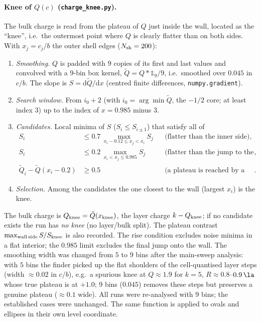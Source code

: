 \paragraph{Knee of $Q(c)$ (\texttt{charge\_knee.py}).}
The bulk charge is read from the plateau of $Q$ just inside the wall, located as the
``knee'', i.e.\ the outermost point where $Q$ is clearly flatter than on both sides.
With $x_j=c_j/b$ the outer shell edges ($N_{\rm sh}=200$):
\begin{enumerate}
  \item \emph{Smoothing.} $Q$ is padded with $9$ copies of its first and last values and
        convolved with a $9$-bin box kernel, $\tilde Q = Q * \mathbb{1}_9/9$, i.e.\ smoothed over
        $0.045$ in $c/b$. The slope is $S=\mathrm{d}\tilde Q/\mathrm{d}x$ (centred finite differences,
        \texttt{numpy.gradient}).
  \item \emph{Search window.} From $i_0+2$ (with $i_0=\arg\min\tilde Q$, the $-1/2$ core; at least
        index 3) up to the index of $x=0.985$ minus 3.
  \item \emph{Candidates.} Local minima of $S$ ($S_i\le S_{i\pm1}$) that satisfy all of
        \begin{align}
          S_i &\le 0.7\, \max_{x_i-0.12\le x_j< x_i} S_j &&\text{(flatter than the inner side)},\\
          S_i &\le 0.2\, \max_{x_i< x_j\le 0.985} S_j &&\text{(flatter than the jump to the wall)},\\
          \tilde Q_i - \tilde Q(x_i-0.2) &\ge 0.5 &&\text{(a plateau is reached by a rise)} .
        \end{align}
  \item \emph{Selection.} Among the candidates the one closest to the wall (largest $x_i$) is the knee.
\end{enumerate}
The bulk charge is $Q_{\rm knee}=\tilde Q(x_{\rm knee})$, the layer charge $k-Q_{\rm knee}$; if no
candidate exists the run has \emph{no knee} (no layer/bulk split). The plateau contrast
$\max_{\rm wall\,side}S/S_{\rm knee}$ is also recorded. The rise condition excludes noise minima in
a flat interior; the $0.985$ limit excludes the final jump onto the wall.
The smoothing width was changed from $5$ to $9$ bins after the main-sweep analysis: with $5$ bins
the finder picked up the flat shoulders of the cell-quantised layer steps (width $\approx0.02$ in
$c/b$), e.g.\ a spurious knee at $Q\approx1.9$ for $k=5$, $R\approx0.8$--$0.9\,\la$ whose true plateau is
at $+1.0$; $9$ bins ($0.045$) removes these steps but preserves a genuine plateau
($\approx0.1$ wide). All runs were re-analysed with $9$ bins; the established cases were unchanged.
The same function is applied to ovals and ellipses in their own level coordinate.

